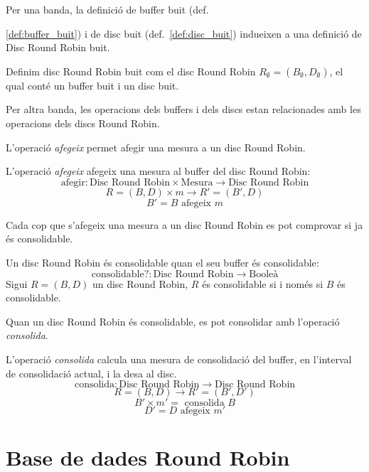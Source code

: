 Per una banda, la definició de buffer buit (def.~{\ref{def:buffer_buit}) i de disc buit (def.~\ref{def:disc_buit}) indueixen a una definició de Disc Round Robin buit. 

\begin{definition}\label{def:disc_round_robin_buit}
  Definim disc Round Robin buit com el disc Round Robin $R_{\emptyset}
  = (B_{\emptyset},D_{\emptyset})$, el qual conté un buffer buit i un
  disc buit.
\end{definition}

Per altra banda, les operacions dels buffers i dels discs estan relacionades amb les operacions dels discs Round Robin. 

L'operació \emph{afegeix} permet afegir una mesura a un disc Round Robin.

\begin{definition}
  L'operació \emph{afegeix} afegeix una mesura al buffer del disc Round Robin:
  \[
  \text{afegir}: \text{Disc Round Robin} \times \text{Mesura} \longrightarrow \text{Disc Round Robin}
  \]
  \[
  R=(B,D) \times m \longrightarrow R'= (B',D)
  \]
  \[
  B'= B \text{ afegeix } m
  \]
\end{definition}

Cada cop que s'afegeix una mesura a un disc Round Robin es pot comprovar si ja és consolidable. 

\begin{definition}
  Un disc Round Robin és consolidable quan el seu buffer és consolidable:
  \[
  \text{consolidable?}: \text{Disc Round Robin} \longrightarrow \text{Booleà}
  \]
  Sigui $R=(B,D)$ un disc Round Robin, $R$ és consolidable si i només
  si $B$ és consolidable.
\end{definition}


Quan un disc Round Robin és consolidable, es pot consolidar amb l'operació \emph{consolida}. 

\begin{definition}
  L'operació \emph{consolida} calcula una  mesura de consolidació del buffer, en
  l'interval de consolidació actual, i la desa al disc. 
  \[
  \text{consolida}: \text{Disc Round Robin} \longrightarrow \text{Disc Round Robin}
  \]
  \[
  R=(B,D) \longrightarrow R'= (B',D')
  \]
  \[
  B' \times m'= \text{ consolida } B 
  \]
  \[
  D'= D \text{ afegeix } m'
  \]
\end{definition}



\section{Base de dades Round Robin}\label{sec:model:rrd}

}
